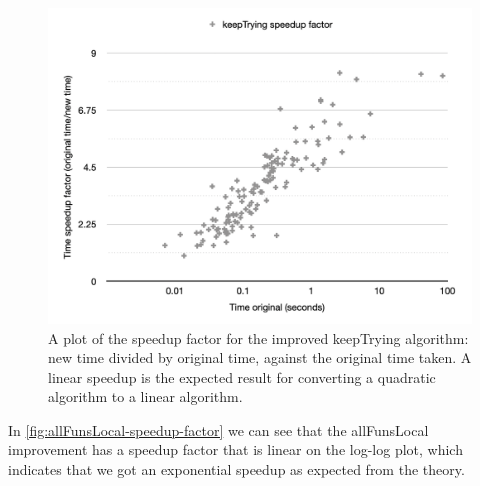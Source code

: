 \begin{figure}
    \centering
    \includegraphics[scale=0.5]{figure/keepTrying-speedup-factor.png}
    \caption{A plot of the speedup factor for the improved keepTrying algorithm: new time divided by original time, against the original time taken. A linear speedup is the expected result for converting a quadratic algorithm to a linear algorithm.}
    \label{fig:keepTrying-speedup-factor}
\end{figure}

In \autoref{fig:allFunsLocal-speedup-factor} we can see that the allFunsLocal improvement has a speedup factor that is linear on the log-log plot, which indicates that we got an exponential speedup as expected from the theory.

